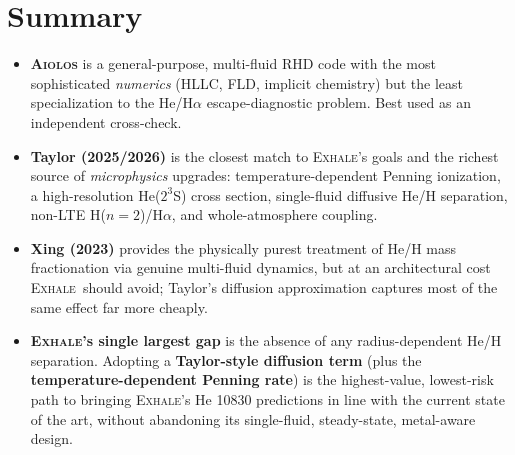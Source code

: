 \documentclass[11pt]{article}
\newcommand{\EXHALE}{\textsc{Exhale}}
\newcommand{\AIOLOS}{\textsc{Aiolos}}
\begin{document}
\section{Summary}
\begin{itemize}[nosep]
  \item \textbf{\AIOLOS} is a general-purpose, multi-fluid RHD code with the most
    sophisticated \emph{numerics} (HLLC, FLD, implicit chemistry) but the least
    specialization to the He/H$\alpha$ escape-diagnostic problem. Best used as an independent
    cross-check.
  \item \textbf{Taylor (2025/2026)} is the closest match to \EXHALE's goals and the richest
    source of \emph{microphysics} upgrades: temperature-dependent Penning ionization, a
    high-resolution He($2^3$S) cross section, single-fluid diffusive He/H separation, non-LTE
    H($n{=}2$)/H$\alpha$, and whole-atmosphere coupling.
  \item \textbf{Xing (2023)} provides the physically purest treatment of He/H mass
    fractionation via genuine multi-fluid dynamics, but at an architectural cost \EXHALE\
    should avoid; Taylor's diffusion approximation captures most of the same effect far more
    cheaply.
  \item \textbf{\EXHALE's single largest gap} is the absence of any radius-dependent He/H
    separation. Adopting a \textbf{Taylor-style diffusion term} (plus the
    \textbf{temperature-dependent Penning rate}) is the highest-value, lowest-risk path to
    bringing \EXHALE's He 10830 predictions in line with the current state of the art,
    without abandoning its single-fluid, steady-state, metal-aware design.
\end{itemize}
\end{document}
